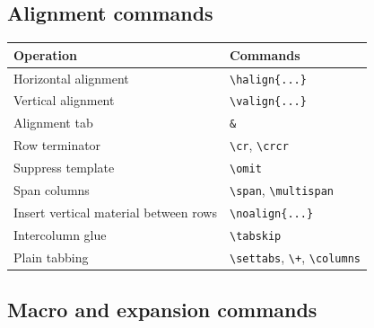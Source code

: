 \documentclass[11pt]{article}
\begin{document}
\subsection{Alignment commands}\label{alignment-commands}

\begin{longtable}[]{@{}ll@{}}
\toprule\noalign{}
Operation & Commands \\
\midrule\noalign{}
\endhead
\bottomrule\noalign{}
\endlastfoot
Horizontal alignment & \texttt{\textbackslash{}halign\{...\}} \\
Vertical alignment & \texttt{\textbackslash{}valign\{...\}} \\
Alignment tab & \texttt{\&} \\
Row terminator & \texttt{\textbackslash{}cr}, \texttt{\textbackslash{}crcr} \\
Suppress template & \texttt{\textbackslash{}omit} \\
Span columns & \texttt{\textbackslash{}span}, \texttt{\textbackslash{}multispan} \\
Insert vertical material between rows & \texttt{\textbackslash{}noalign\{...\}} \\
Intercolumn glue & \texttt{\textbackslash{}tabskip} \\
Plain tabbing & \texttt{\textbackslash{}settabs}, \texttt{\textbackslash{}+}, \texttt{\textbackslash{}columns} \\
\end{longtable}

\subsection{Macro and expansion commands}\label{macro-and-expansion-commands}
\end{document}
